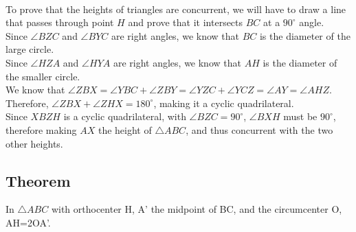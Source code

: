 \documentclass{article}
\begin{document}
\\
To prove that the heights of triangles are concurrent, we will have to draw a line that passes through point $H$ and prove that it intersects $BC$ at a $90^\circ$ angle.\\
Since $\angle BZC$ and $\angle BYC$ are right angles, we know that $BC$ is the diameter of the large circle. \\
Since $\angle HZA$ and $\angle HYA$ are right angles,   we know that $AH$ is the diameter of the smaller circle. \\
We know that $\angle ZBX=\angle YBC+\angle ZBY=\angle YZC+\angle YCZ=\angle AY=\angle AHZ$. Therefore, $\angle ZBX+\angle ZHX=180^\circ$, making it a cyclic quadrilateral. \\
Since $XBZH$ is a cyclic quadrilateral, with $\angle BZC=90^\circ$, $\angle BXH$ must be $90^\circ$, therefore making $AX$ the height of $\triangle ABC$, and thus concurrent with the two other heights.




\pagebreak

\subsection{Theorem}

In $\triangle ABC$ with orthocenter H, A' the midpoint of BC, and the circumcenter O, AH=2OA'.





\end{document}
